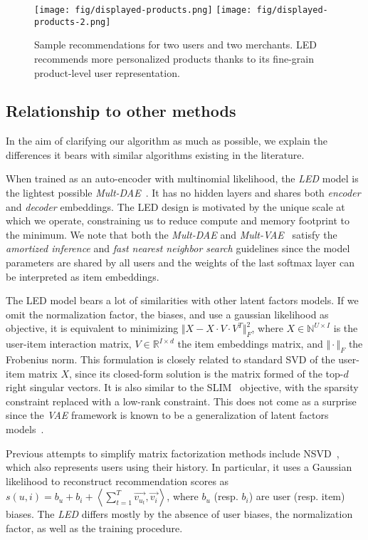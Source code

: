 \documentclass[sigconf]{acmart}
\begin{document}
\begin{figure}[h]
    \centering
    \texttt{[image: fig/displayed-products.png]}
    \texttt{[image: fig/displayed-products-2.png]}
    \caption{Sample recommendations for two users and two merchants. LED recommends more personalized products thanks to its fine-grain product-level user representation.}
    \label{fig:viewer-results}
\end{figure}

\subsection{Relationship to other methods} 
In the aim of clarifying our algorithm as much as possible, we explain the differences it bears with similar algorithms existing in the literature.

When trained as an auto-encoder with multinomial likelihood, the \emph{LED} model is the lightest possible \emph{Mult-DAE}~\cite{variational-liang-2018}. It has no hidden layers and shares both \emph{encoder} and \emph{decoder} embeddings. The LED design is motivated by the unique scale at which we operate, constraining us to reduce compute and memory footprint to the minimum. We note that both the \emph{Mult-DAE} and \emph{Mult-VAE}~\cite{variational-liang-2018} satisfy the \emph{amortized inference} and \emph{fast nearest neighbor search} guidelines since the model parameters are shared by all users and the weights of the last softmax layer can be interpreted as item embeddings.

The LED model bears a lot of similarities with other latent factors models. If we omit the normalization factor, the biases, and use a gaussian likelihood as objective, it is equivalent to minimizing $ \Vert X - X \cdot V \cdot V^T \Vert^2_F $, where $ X \in \mathbb{N}^{U \times I} $ is the user-item interaction matrix, $ V \in \mathbb{R}^{I \times d} $ the item embeddings matrix, and $ \Vert \cdot \Vert_F $ the Frobenius norm. This formulation is closely related to standard SVD of the user-item matrix $ X $, since its closed-form solution is the matrix formed of the top-$d$ right singular vectors. It is also similar to the SLIM~\cite{slim} objective, with the sparsity constraint replaced with a low-rank constraint. This does not come as a surprise since the \emph{VAE} framework is known to be a generalization of latent factors models~\cite{variational-liang-2018}.

Previous attempts to simplify matrix factorization methods include NSVD~\cite{paterek}, which also represents users using their history. In particular, it uses a Gaussian likelihood to reconstruct recommendation scores as $ s(u, i) = b_u + b_i + \left\langle \sum_{t=1}^T \overrightarrow{v_{u_t}}, \overrightarrow{v_i} \right\rangle $, where $ b_u $ (resp. $ b_i $) are user (resp. item) biases. The \emph{LED} differs mostly by the absence of user biases, the normalization factor, as well as the training procedure.
\end{document}

